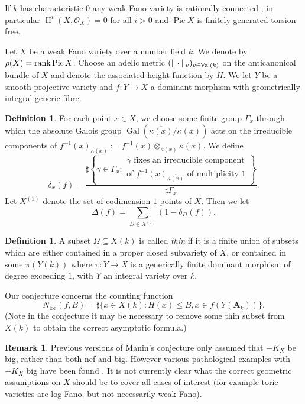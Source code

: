 \documentclass[a4paper,12pt,reqno]{amsart}
\numberwithin{equation}{section} \numberwithin{figure}{section}
\DeclareMathOperator{\Pic}{Pic} \DeclareMathOperator{\Div}{Div}
\DeclareMathOperator{\Gal}{Gal} \DeclareMathOperator{\NS}{NS}
\DeclareMathOperator{\HH}{H}
\newcommand{\OO}{\mathcal{O}}
\newcommand{\Adele}{\mathbf{A}}
\renewcommand{\leq}{\leqslant}
\renewcommand{\#}{\sharp}
\theoremstyle{definition}
\newtheorem{definition}[lemma]{Definition}
\newtheorem{remark}[lemma]{Remark}
\numberwithin{lemma}{section}
\begin{document}
If $k$ has characteristic $0$ any weak Fano variety is rationally connected \cite[Cor. 1.13]{HM07}; in particular $\HH^i(X, \OO_X) = 0$ for all $i> 0 $ and $\Pic X$ is finitely generated torsion free.

Let $X$ be a weak Fano variety over a number field $k$. We denote by $\rho(X) = \rank \Pic X$. Choose an adelic metric $(\| \cdot \|_v)_{v \in \operatorname{Val}(k)}$ on the anticanonical bundle of $X$ and denote the associated height function by  $H$. We let $Y$ be a smooth projective variety and $f: Y \to X$ a dominant morphism with geometrically integral  generic fibre.

\begin{definition}
	For each point
	$x \in X$, we choose some finite group $\Gamma_x$ through which 
	the absolute Galois group $\Gal(\overline{\kappa(x)}/ \kappa(x))$ 
	acts on the irreducible 	components of $f^{-1}(x)_{\overline{\kappa(x)}}:=f^{-1}(x) \otimes_{\kappa(x)} \overline{\kappa(x)}$.
	We define
	$$\delta_x(f) = \frac{\# \left\{ \gamma \in \Gamma_x : 
	\begin{array}{l}
		\gamma \text{ fixes an irreducible component} \\
		\text{of $f^{-1}(x)_{\overline{\kappa(x)}}$ of multiplicity } 1
	\end{array}
	\right \}}
	{\# \Gamma_x }.$$
	Let $X^{(1)}$ denote the set of codimension $1$ points of $X$. Then
	we let
	$$\Delta(f) = \sum_{D \in X^{(1)}} ( 1 - \delta_D(f)).$$
\end{definition}


\begin{definition}
A subset $\Omega \subseteq X(k)$ is called \emph{thin}  if it is
a finite union of subsets which are either contained in a proper closed subvariety of $X$, or contained 
in some $\pi(Y(k))$ where $\pi: Y \to X$ is a generically finite dominant morphism 
of degree exceeding $1$, with $Y$ an integral variety over $k$.
\end{definition}

Our conjecture concerns  the counting function
$$N_{\textrm{loc}}(f,B) = \#\{ x \in X(k) : H(x) \leq B, x \in f(Y(\Adele_k))\}.$$
(Note in the conjecture it may be necessary to remove some thin subset from $X(k)$ to obtain the correct asymptotic formula.)

\begin{remark}
	Previous versions of Manin's conjecture only assumed that $-K_X$ be big, rather than both nef and big.
	However various pathological examples with $-K_X$ big have been found \cite[\S 5.1]{LST22}. It is not
	currently clear what the correct geometric assumptions on $X$ should be to cover all cases of interest
	(for example toric varieties are log Fano, but not necessarily weak Fano).
\end{remark}
\end{document}
